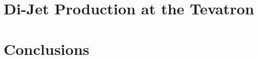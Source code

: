 \documentclass[12pt,PhD]{Thesis}
\begin{document}
\chapter{Di-Jet Production at the Tevatron}
    
    
    
    
    
\chapter{Conclusions}
    
\appendix

    


\end{document}
